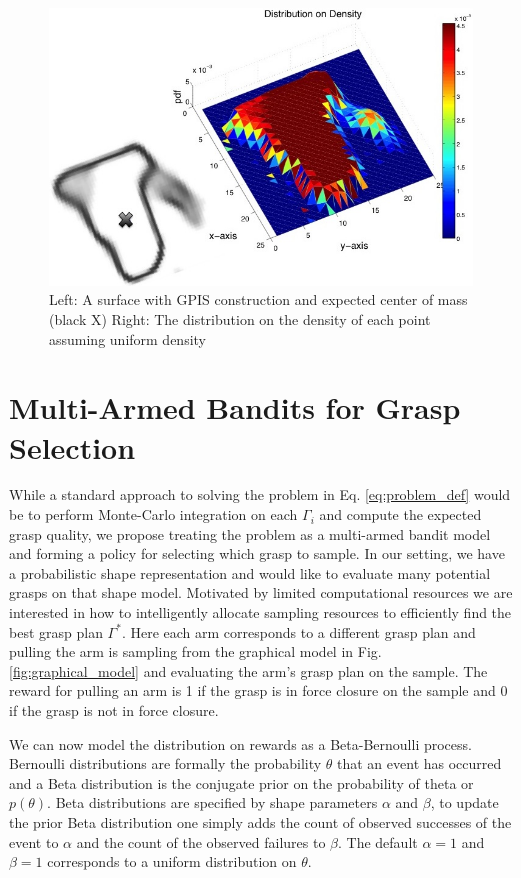 \documentclass[letterpaper, 10 pt, conference]{ieeeconf}  %
\begin{document}
\begin{figure}[ht!]
\centering
\includegraphics[scale = 0.3]{figures/Slide06.jpg}
\caption{ \footnotesize Left: A surface with GPIS construction and expected center of mass (black X)
Right: The distribution on the density of each point assuming uniform density}
\vspace*{-10pt}
\label{fig:GPIS_MASS}
\end{figure}


\section{Multi-Armed Bandits for Grasp Selection}
While a standard approach to solving the problem in Eq. \ref{eq:problem_def} would be to perform Monte-Carlo integration on each $\Gamma_i$ and compute the expected grasp quality, we propose treating the problem as a multi-armed bandit model and forming a policy for selecting which grasp to sample. 
In our setting, we have a probabilistic shape representation and would like to evaluate many potential grasps on that shape model.
Motivated by limited computational resources we are interested in how to intelligently allocate sampling resources to efficiently find the best grasp plan $\Gamma^*$.
Here each arm corresponds to a different grasp plan and pulling the arm is sampling from the graphical model in Fig. \ref{fig:graphical_model} and evaluating the arm's grasp plan on the sample.
The reward for pulling an arm is 1 if the grasp is in force closure on the sample and 0 if the grasp is not in force closure. 

We can now model the distribution on rewards as a Beta-Bernoulli process. Bernoulli distributions are formally the probability $\theta$ that an event has occurred and a Beta distribution is the conjugate prior on the probability of theta or $p(\theta)$. Beta distributions are specified by shape parameters $\alpha$ and $\beta$, to update the prior Beta distribution one simply adds the count of observed successes of the event to $\alpha$ and the count of the observed failures to $\beta$. The default $\alpha =1 $ and $\beta =1$ corresponds to a uniform distribution on $\theta$. 
\end{document}
